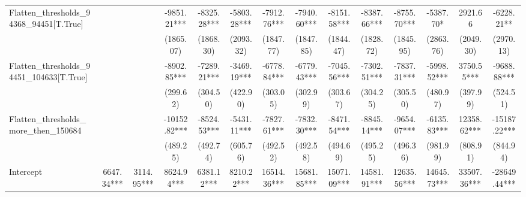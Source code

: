\begin{subappendices}
{\begin{landscape}
\begin{table}[H]
{\begin{tabular}{lccccccccccccc}
Flatten_thresholds_94368_94451[T.True]   &                    &                         & -9851.21***                      & -8325.28*** & -5803.28***              & -7912.76***       & -7940.60*** & -8151.58***          & -8387.66***             & -8755.70***              & -5387.70*             & 2921.66                   & -6228.21**                 \\
                                         &                    &                         & (1865.07)                        & (1868.30)   & (2093.32)                & (1847.77)         & (1847.85)   & (1844.47)            & (1828.72)               & (1845.95)                & (2863.76)             & (2049.30)                 & (2970.13)                  \\
Flatten_thresholds_94451_104633[T.True]  &                    &                         & -8902.85***                      & -7289.21*** & -3469.19***              & -6778.84***       & -6779.43*** & -7045.56***          & -7302.51***             & -7837.31***              & -5998.52***           & 3750.55***                & -9688.88***                \\
                                         &                    &                         & (299.62)                         & (304.50)    & (422.90)                 & (303.05)          & (302.99)    & (303.67)             & (304.25)                & (305.50)                 & (480.97)              & (397.99)                  & (524.51)                   \\
Flatten_thresholds_more_then_150684      &                    &                         & -10152.82***                     & -8524.53*** & -5431.11***              & -7827.61***       & -7832.30*** & -8471.54***          & -8845.14***             & -9654.07***              & -6135.83***           & 12358.62***               & -15187.22***               \\
                                         &                    &                         & (489.25)                         & (492.74)    & (605.76)                 & (492.52)          & (492.58)    & (494.69)             & (495.25)                & (496.36)                 & (981.99)              & (808.91)                  & (844.94)                   \\
Intercept                                & 6647.34***         & 3114.95***              & 8624.94***                       & 6381.12***  & 8210.22***               & 16514.36***       & 15681.85*** & 15071.09***          & 14581.91***             & 12635.56***              & 14645.73***           & 33507.36***               & -28649.44***               \\

\end{tabular}}
\end{table}
\end{landscape}}
\end{subappendices}
